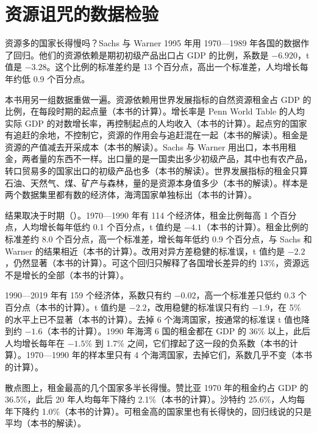 \section{资源诅咒的数据检验}\label{sec:oil-test}

资源多的国家长得慢吗？Sachs 与 Warner 1995 年用 1970—1989 年各国的数据作了回归\cite{sachswarner1995}。他们的资源依赖是期初初级产品出口占 GDP 的比例，系数是 $-6.920$，t 值是 $-3.28$\cite{sachswarner1995}。这个比例的标准差约是 13 个百分点，高出一个标准差，人均增长每年约低 0.9 个百分点\cite{sachswarner1995}。

本书用另一组数据重做一遍。资源依赖用世界发展指标的自然资源租金占 GDP 的比例，在每段时期的起点量（本书的计算）\cite{wdi47}。增长率是 Penn World Table 的人均实际 GDP 的对数增长率，再控制起点的人均收入（本书的计算）\cite{pwt1001}。起点穷的国家有追赶的余地，不控制它，资源的作用会与追赶混在一起（本书的解读）。租金是资源的产值减去开采成本（本书的解读）。Sachs 与 Warner 用出口，本书用租金，两者量的东西不一样。出口量的是一国卖出多少初级产品，其中也有农产品，转口贸易多的国家出口的初级产品也多（本书的解读）。世界发展指标的租金只算石油、天然气、煤、矿产与森林\cite{wdi47}，量的是资源本身值多少（本书的解读）。样本是两个数据集里都有数的经济体，海湾国家单独标出（本书的计算）。

结果取决于时期（）。1970—1990 年有 114 个经济体，租金比例每高 1 个百分点，人均增长每年低约 0.1 个百分点，t 值约是 $-4.1$（本书的计算）。租金比例的标准差约 8.0 个百分点，高一个标准差，增长每年低约 0.9 个百分点，与 Sachs 和 Warner 的结果相近（本书的计算）。改用对异方差稳健的标准误，t 值约是 $-2.2$，仍然显著（本书的计算）。可这个回归只解释了各国增长差异的约 13\%，资源远不是增长的全部（本书的计算）。

1990—2019 年有 159 个经济体，系数只有约 $-0.02$，高一个标准差只低约 0.3 个百分点（本书的计算）。t 值约是 $-2.2$，改用稳健的标准误只有约 $-1.9$，在 5\% 的水平上已不显著（本书的计算）。去掉 6 个海湾国家，按通常的标准误 t 值也降到约 $-1.6$（本书的计算）。1990 年海湾 6 国的租金都在 GDP 的 36\% 以上，此后人均增长每年在 $-1.5\%$ 到 1.7\% 之间，它们撑起了这一段的负系数（本书的计算）。1970—1990 年的样本里只有 4 个海湾国家，去掉它们，系数几乎不变（本书的计算）。

散点图上，租金最高的几个国家多半长得慢。赞比亚 1970 年的租金约占 GDP 的 36.5\%，此后 20 年人均每年下降约 2.1\%（本书的计算）。沙特约 25.6\%，人均每年下降约 1.0\%（本书的计算）。可租金高的国家里也有长得快的，回归线说的只是平均（本书的解读）。

